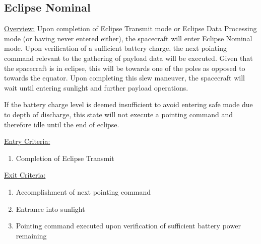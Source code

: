\documentclass{article}
\begin{document}
\newpage

\subsection{Eclipse Nominal}

\underline{Overview:} Upon completion of Eclipse Transmit mode or Eclipse Data Processing mode (or having never entered either), the spacecraft will enter Eclipse Nominal mode. Upon verification of a sufficient battery charge, the next pointing command relevant to the gathering of payload data will be executed. Given that the spacecraft is in eclipse, this will be towards one of the poles as opposed to towards the equator. Upon completing this slew maneuver, the spacecraft will wait until entering sunlight and further payload operations.

If the battery charge level is deemed insufficient to avoid entering safe mode due to depth of discharge, this state will not execute a pointing command and therefore idle until the end of eclipse.

\underline{Entry Criteria:} 

\begin{enumerate}
\item Completion of Eclipse Transmit
\end{enumerate}

\underline{Exit Criteria:}

\begin{enumerate}
\item Accomplishment of next pointing command
\item Entrance into sunlight
\item Pointing command executed upon verification of sufficient battery power remaining
\end{enumerate}
\end{document}
